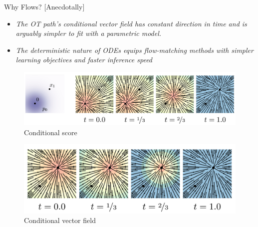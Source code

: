 \documentclass{beamer}
\begin{document}
\begin{frame}{Why Flows?}
    [Anecdotally]{
        \begin{itemize}
            \item{\footnotesize \emph{The OT path’s conditional
                vector field has constant direction in time and is arguably simpler to fit with a parametric model. \citep{lipmanFlowMatchingGenerative2023}}}
            \item{\footnotesize \emph{The deterministic
                nature of ODEs equips flow-matching methods with simpler learning objectives and faster inference speed \citep{zhengIntentionConditionedFlowOccupancy2025}}}
        \end{itemize}
    }
    \vspace*{.5cm}
\begin{figure}
    \hspace*{-.5cm}
    \begin{minipage}{0.50\linewidth}
    \includegraphics[width=1.2\linewidth]{figures/conditional-score.png}
    \hspace*{2.5cm}
    {\footnotesize Conditional score}
    \end{minipage}
    \hspace*{1cm}
    \begin{minipage}{0.39\linewidth}
    \centering
    \includegraphics[width=1.2\linewidth]{figures/conditional-vector-field.png}
    {\footnotesize Conditional vector field}
    \end{minipage}
\end{figure}
\end{frame}
\end{document}

